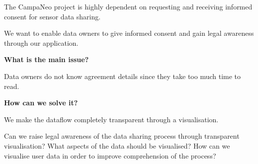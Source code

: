 
The CampaNeo project is highly dependent on requesting and receiving  informed consent for sensor data sharing. 

We want to enable data owners to give informed consent and gain legal awareness through our application.

\textbf{What is the main issue?}

Data owners do not know agreement details since they take too much time to read.

\textbf{How can we solve it?}

We make the dataflow completely transparent through a visualisation.

Can we raise legal awareness of the data sharing process through transparent visualisation?
What aspects of the data should be visualised? How can we visualise user data in order to improve comprehension of the process?

